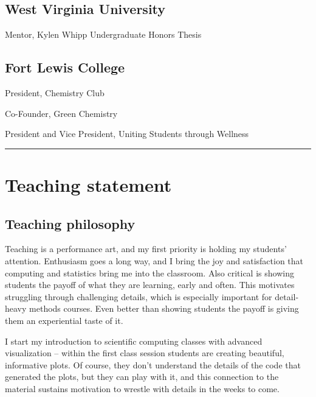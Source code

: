 \subsection{West Virginia University}\label{west-virginia-university-1}

\begin{description}
\tightlist
\item[2010 - 2011]
Mentor, Kylen Whipp Undergraduate Honors Thesis
\end{description}

\subsection{Fort Lewis College}\label{fort-lewis-college-1}

\begin{description}
\tightlist
\item[2003 - 2004]
President, Chemistry Club
\item[2002 - 2004]
Co-Founder, Green Chemistry
\item[2002 - 2004]
President and Vice President, Uniting Students through Wellness
\end{description}

\begin{center}\rule{0.5\linewidth}{\linethickness}\end{center}

\section{Teaching statement}\label{teaching-statement}

\subsection{Teaching philosophy}\label{teaching-philosophy}

Teaching is a performance art, and my first priority is holding my
students' attention. Enthusiasm goes a long way, and I bring the joy and
satisfaction that computing and statistics bring me into the classroom.
Also critical is showing students the payoff of what they are learning,
early and often. This motivates struggling through challenging details,
which is especially important for detail-heavy methods courses. Even
better than showing students the payoff is giving them an experiential
taste of it. \medskip

I start my introduction to scientific computing classes with advanced
visualization -- within the first class session students are creating
beautiful, informative plots. Of course, they don't understand the
details of the code that generated the plots, but they can play with it,
and this connection to the material sustains motivation to wrestle with
details in the weeks to come. \medskip

